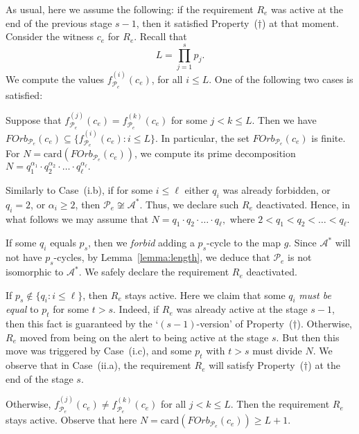 \documentclass[a4paper,UKenglish,cleveref, autoref, thm-restate]{lipics-v2021}
\begin{document}
As usual, here we assume the following: if the requirement $R_e$ was active at the end of the previous stage $s-1$, then it satisfied Property~($\dagger$) at that moment. 
Consider the witness $c_e$ for $R_e$. 
Recall that
\begin{equation}  \label{equ:length-agreement}
	L = \prod_{j=1}^{s} p_j.
\end{equation}
We compute the values $f_{\mathcal{P}_e}^{(i)}(c_e)$, for all $i\leq L$. One of the following two cases is satisfied:



 Suppose that $f_{\mathcal{P}_e}^{(j)}(c_e) = f_{\mathcal{P}_e}^{(k)}(c_e)$ for some $j<k\leq L$. 
Then we have $FOrb_{\mathcal{P}_e}(c_e) \subseteq \{ f_{\mathcal{P}_e}^{(i)}(c_e) : i\leq L\}$. In particular, the set $FOrb_{\mathcal{P}_e}(c_e)$ is finite. For $N = \mathrm{card}(FOrb_{\mathcal{P}_e}(c_e))$, we compute its prime decomposition
$
	N = q_1^{\alpha_1} \cdot q_2^{\alpha_2} \cdot \ldots \cdot q_{\ell}^{\alpha_\ell}.
$

Similarly to Case~(i.b), if for some $i\leq \ell$ either $q_i$ was already forbidden, or $q_i = 2$, or $\alpha_i\geq 2$, then $\mathcal{P}_e \not\cong \mathcal{A}^{\ast}$. Thus, we declare such $R_e$ deactivated. Hence, in what follows we may assume that 
$
	N = q_1 \cdot q_2 \cdot \ldots \cdot q_{\ell},
$
where $2 < q_1 < q_2 < \dots < q_{\ell}$.

If some $q_i$ equals $p_s$, then we \emph{forbid} adding a $p_s$-cycle to the map $g$. Since $\mathcal{A}^{\ast}$ will not have $p_s$-cycles, by Lemma~\ref{lemma:length}, we deduce that $\mathcal{P}_e$ is not isomorphic to $\mathcal{A}^{\ast}$. We safely declare the requirement $R_e$ deactivated.

If $p_s\not\in \{ q_i : i\leq \ell\}$, then $R_e$ stays active. Here we claim that some $q_i$ \emph{must be equal} to $p_t$ for some $t >s$. Indeed, if $R_e$ was already active at the stage $s-1$, then this fact is guaranteed by the `$(s-1)$-version' of Property~($\dagger$). Otherwise, $R_e$ moved from being on the alert to being active at the stage $s$. But then this move was triggered by Case~(i.c), and some $p_t$ with $t>s$ must divide $N$. 
We observe that in Case~(ii.a), the requirement $R_e$ will satisfy Property~($\dagger$) at the end of the stage $s$.



 Otherwise, $f_{\mathcal{P}_e}^{(j)}(c_e) \neq f_{\mathcal{P}_e}^{(k)}(c_e)$ for all $j<k\leq L$. Then the requirement $R_e$ stays active. 
Observe that here $N = \mathrm{card}(FOrb_{\mathcal{P}_e}(c_e)) \geq L+1$.
\end{document}
